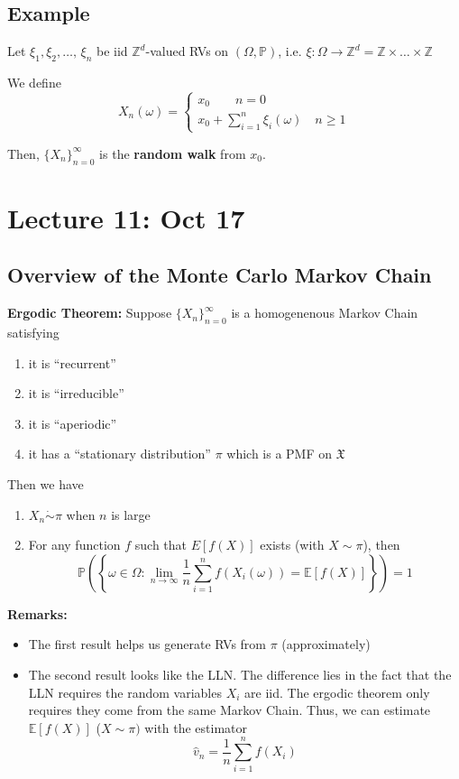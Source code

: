 \documentclass[12pt]{article}
\renewcommand{\hat}[1]{\widehat{#1}}
\renewcommand{\P}{\mathbb{P}}
\newcommand{\E}{\mathbb{E}}
\newcommand{\mfX}{\mathfrak{X}}
\newcommand{\Z}{\mathbb{Z}}
\begin{document}
\subsection{Example}
Let $\xi_1, \xi_2, \dots,\, \xi_n$ be iid $\Z^d$-valued RVs on $(\Omega, \P)$, i.e. $\xi: \Omega \to \Z^d = \Z \times \dots \times \Z$

We define 
\[X_n(\omega) = \begin{cases}
    x_0 \qquad {n=0}\\
    x_0 + \sum_{i=1}^n \xi_i(\omega) \quad n \geq 1
\end{cases}\]

Then, $\{X_n\}_{n=0}^\infty$ is the \textbf{random walk} from $x_0$. 

\section{Lecture 11: Oct 17}
\subsection{Overview of the Monte Carlo Markov Chain} 

\textbf{Ergodic Theorem:} Suppose $\{X_n\}_{n=0}^\infty$ is a homogenenous Markov Chain satisfying 
\begin{enumerate}
    \item it is ``recurrent''
    \item it is ``irreducible''
    \item it is ``aperiodic''
    \item it has a ``stationary distribution'' $\pi$ which is a PMF on $\mfX$
\end{enumerate}
Then we have 
\begin{enumerate}
    \item $X_n \dot \sim \pi$ when $n$ is large
    \item For any function $f$ such that $E[f(X)]$ exists (with $X \sim \pi$), then 
    \[\P\left(\left\{\omega \in \Omega: \lim_{n\to\infty} \frac{1}{n}\sum_{i=1}^n f(X_i(\omega)) = \E[f(X)]\right\}\right) = 1\]
\end{enumerate}

\textbf{Remarks:}
\begin{itemize}
    \item The first result helps us generate RVs from $\pi$ (approximately)
    \item The second result looks like the LLN. The difference lies in the fact that the LLN requires the random variables $X_i$ are iid. The ergodic theorem only requires they come from the same Markov Chain. Thus, we can estimate $\E[f(X)]$ ($X \sim \pi)$ with the estimator 
    \[\hat v_n = \frac{1}{n}\sum_{i=1}^n f(X_i)\]
\end{itemize}
\end{document}
